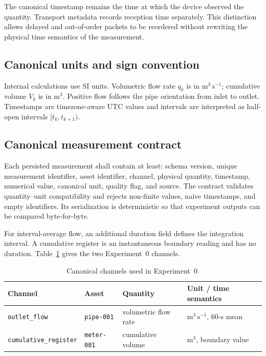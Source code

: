\documentclass[11pt,a4paper]{article}
\begin{document}
The canonical timestamp remains the time at which the device observed the
quantity. Transport metadata records reception time separately. This
distinction allows delayed and out-of-order packets to be reordered without
rewriting the physical time semantics of the measurement.

\subsection{Canonical units and sign convention}
Internal calculations use SI units. Volumetric flow rate $q_k$ is in
$\mathrm{m^3\,s^{-1}}$; cumulative volume $V_k$ is in
$\mathrm{m^3}$. Positive flow follows the pipe orientation from inlet to
outlet. Timestamps are timezone-aware UTC values and intervals are interpreted
as half-open intervals $[t_k,t_{k+1})$.

\subsection{Canonical measurement contract}
Each persisted measurement shall contain at least: schema version, unique
measurement identifier, asset identifier, channel, physical quantity,
timestamp, numerical value, canonical unit, quality flag, and source. The
contract validates quantity--unit compatibility and rejects non-finite values,
naive timestamps, and empty identifiers. Its serialization is deterministic so
that experiment outputs can be compared byte-for-byte.

For interval-average flow, an additional duration field defines the integration
interval. A cumulative register is an instantaneous boundary reading and has no
duration. Table~\ref{tab:channels} gives the two Experiment~0 channels.
\begin{table}[htbp]
  \centering
  \caption{Canonical channels used in Experiment~0.}
  \label{tab:channels}
  \begin{tabular}{llll}
    \toprule
    Channel & Asset & Quantity & Unit / time semantics \\
    \midrule
    \texttt{outlet\_flow} & \texttt{pipe-001} & volumetric flow rate
      & $\mathrm{m^3\,s^{-1}}$, 60-s mean \\
    \texttt{cumulative\_register} & \texttt{meter-001} & cumulative volume
      & $\mathrm{m^3}$, boundary value \\
    \bottomrule
  \end{tabular}
\end{table}
\end{document}
